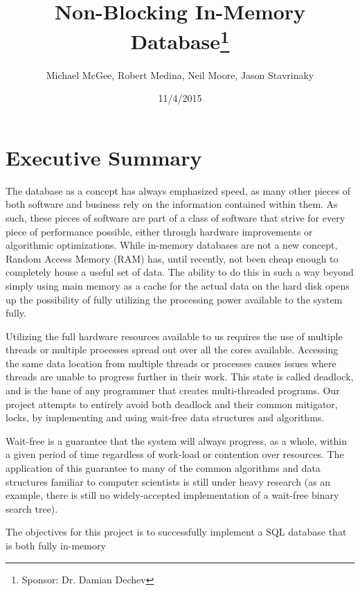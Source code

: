 \documentclass[letterpaper, 12pt]{article}
\title{Non-Blocking In-Memory Database\thanks{Sponsor: Dr. Damian Dechev}}
\author{Michael McGee, Robert Medina, Neil Moore, Jason Stavrinaky}
\date{11/4/2015}
\begin{document}
\maketitle
\newpage

\tableofcontents
\newpage


\section{Executive Summary}
The database as a concept has always emphasized speed, as many other pieces of both software
and business rely on the information contained within them. As such, these pieces of software
are part of a class of software that strive for every piece of performance possible, either through
hardware improvements or algorithmic optimizations. While in-memory databases are not a new concept,
Random Access Memory (RAM) has, until recently, not been cheap enough to completely house a useful
set of data. The ability to do this in such a way beyond simply using main memory as a cache for the
actual data on the hard disk opens up the possibility of fully utilizing the processing power
available to the system fully.
\par\vspace{\baselineskip}
Utilizing the full hardware resources available to us requires the use of multiple threads or
multiple processes spread out over all the cores available. Accessing the same data location
from multiple threads or processes causes issues where threads are unable to progress further in their
work. This state is called deadlock, and is the bane of any programmer that creates multi-threaded
programs. Our project attempts to entirely avoid both deadlock and their common mitigator, locks,
by implementing and using wait-free data structures and algorithms.
\par\vspace{\baselineskip}
Wait-free is a guarantee that the system will always progress, as a whole, within a given period of time
regardless of work-load or contention over resources. The application of this guarantee to many
of the common algorithms and data structures familiar to computer scientists is still under heavy research
(as an example, there is still no widely-accepted implementation of a wait-free binary search tree).
\par\vspace{\baselineskip}
The objectives for this project is to successfully implement a SQL database that is both fully in-memory
\end{document}
